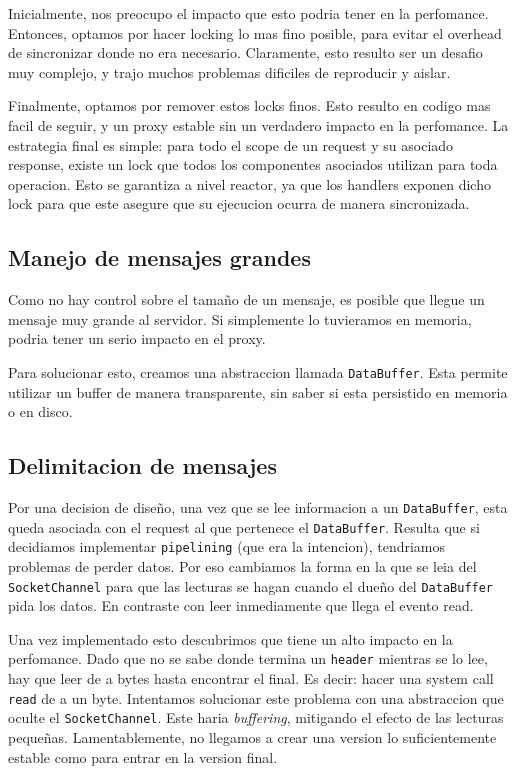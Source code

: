 \documentclass[11pt,a4paper,titlepage]{article}
\begin{document}
    Inicialmente, nos preocupo el impacto que esto podria tener en la perfomance.
    Entonces, optamos por hacer locking lo mas fino posible, para evitar el overhead de sincronizar donde no era necesario.
    Claramente, esto resulto ser un desafio muy complejo, y trajo muchos problemas dificiles de reproducir y aislar.

    Finalmente, optamos por remover estos locks finos.
    Esto resulto en codigo mas facil de seguir, y un proxy estable sin un verdadero impacto en la perfomance.
    La estrategia final es simple: para todo el scope de un request y su asociado response, existe un lock que todos los componentes asociados utilizan para toda operacion.
    Esto se garantiza a nivel reactor, ya que los handlers exponen dicho lock para que este asegure que su ejecucion ocurra de manera sincronizada.

    \subsection{Manejo de mensajes grandes}

    Como no hay control sobre el tamaño de un mensaje, es posible que llegue un mensaje muy grande al servidor.
    Si simplemente lo tuvieramos en memoria, podria tener un serio impacto en el proxy.

    Para solucionar esto, creamos una abstraccion llamada \texttt{DataBuffer}.
    Esta permite utilizar un buffer de manera transparente, sin saber si esta persistido en memoria o en disco.

    \subsection{Delimitacion de mensajes}

    Por una decision de diseño, una vez que se lee informacion a un \texttt{DataBuffer}, esta queda asociada con el request al que pertenece el \texttt{DataBuffer}.
    Resulta que si decidiamos implementar \texttt{pipelining} (que era la intencion), tendriamos problemas de perder datos.
    Por eso cambiamos la forma en la que se leia del \texttt{SocketChannel} para que las lecturas se hagan cuando el dueño del \texttt{DataBuffer} pida los datos.
    En contraste con leer inmediamente que llega el evento read.

    Una vez implementado esto descubrimos que tiene un alto impacto en la perfomance.
    Dado que no se sabe donde termina un \texttt{header} mientras se lo lee, hay que leer de a bytes hasta encontrar el final.
    Es decir: hacer una system call \texttt{read} de a un byte.
    Intentamos solucionar este problema con una abstraccion que oculte el \texttt{SocketChannel}.
    Este haria \textit{buffering}, mitigando el efecto de las lecturas pequeñas.
    Lamentablemente, no llegamos a crear una version lo suficientemente estable como para entrar en la version final.
\end{document}
